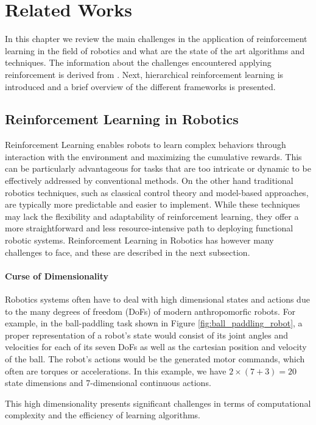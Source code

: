 \chapter{Related Works}
\label{ch:related_works}
In this chapter we review the main challenges in the application of reinforcement learning in the
field of robotics and what are the state of the art algorithms and techniques. 
The information about the challenges encountered applying reinforcement is derived from \cite{Kober2013}.
Next, hierarchical reinforcement learning is introduced and a brief overview of the different frameworks is presented.

\section{Reinforcement Learning in Robotics}
Reinforcement Learning enables robots to learn complex behaviors through interaction with the environment and maximizing the cumulative rewards.
This can be particularly advantageous for tasks that are too intricate or dynamic to be effectively addressed by conventional methods.
On the other hand traditional robotics techniques, such as classical control theory and model-based approaches, are typically more predictable and easier to implement.
While these techniques may lack the flexibility and adaptability of reinforcement learning, they offer a more straightforward and less resource-intensive path to deploying
functional robotic systems. Reinforcement Learning in Robotics has however many challenges to face, and these are described in the next subsection.

\subsubsection{Curse of Dimensionality}
Robotics systems often have to deal with high dimensional states and actions due to the many degrees of freedom (DoFs) of modern
anthropomorfic robots. For example, in the ball-paddling task shown in Figure \ref{fig:ball_paddling_robot}, a proper representation
of a robot's state would consist of its joint angles and velocities for each of its seven DoFs as well as the cartesian position
and velocity of the ball. The robot's actions would be the generated motor commands, which often are torques or accelerations.
In this example, we have $2\times\left(7 + 3\right)=20$ state dimensions and 7-dimensional continuous actions.

This high dimensionality presents significant challenges in terms of computational complexity 
and the efficiency of learning algorithms.

